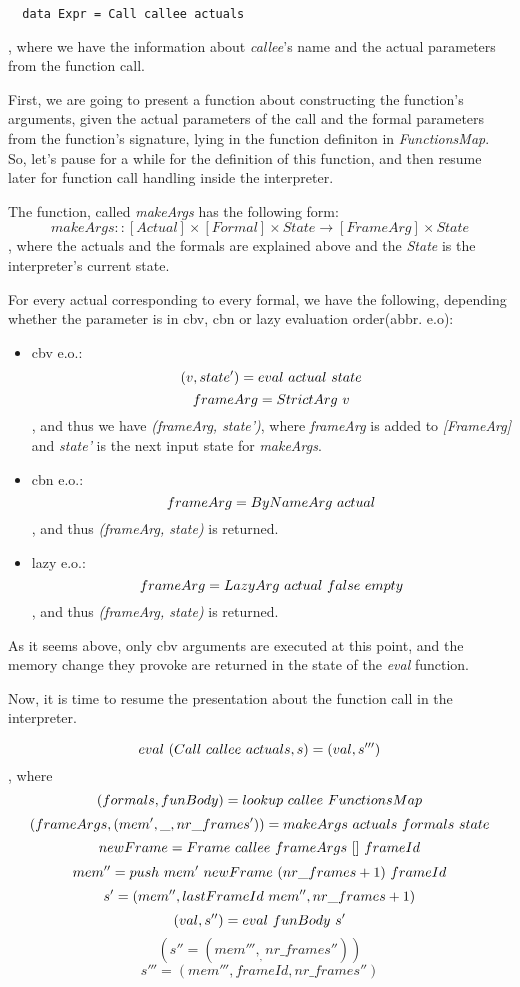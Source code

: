 \documentclass[diploma]{softlab-thesis}
\begin{document}
\begin{verbatim}
  data Expr = Call callee actuals 
\end{verbatim}

, where we have the information about \textit{callee}'s name and the actual parameters from the function call. 

First, we are going to present a function about constructing the function's arguments, given the actual parameters of the call 
and the formal parameters from the function's signature, lying in the function definiton in \textit{FunctionsMap}. So, let's 
pause for a while for the definition of this function, and then resume later for function call handling inside the 
interpreter.

The function, called \textit{makeArgs} has the following form:
\[makeArgs :: [Actual] \times [Formal] \times State \rightarrow [FrameArg] \times State \]
, where the actuals and the formals are explained above and the \textit{State} is the interpreter's current state.

For every actual corresponding to every formal, we have the following, depending whether the parameter is in 
cbv, cbn or lazy evaluation order(abbr. e.o):
\begin{itemize}
  \item cbv e.o.: 
  \[(v, state') = eval \hfill\ actual \hfill\ state \]
  \[frameArg = StrictArg \hfill\ v\]
  , and thus we have \textit{(frameArg, state')}, where \textit{frameArg} is added to \textit{[FrameArg]} and 
  \textit{state'} is the next input state for \textit{makeArgs}. 
  \item cbn e.o.:
  \[frameArg = ByNameArg \hfill\ actual \] 
  , and thus \textit{(frameArg, state)} is returned.
  \item lazy e.o.:
  \[frameArg = LazyArg \hfill\ actual \hfill\ false \hfill\ empty \]
  , and thus \textit{(frameArg, state)} is returned.  
\end{itemize}

As it seems above, only cbv arguments are executed at this point, and the memory change they provoke are returned 
in the state of the \textit{eval} function.

Now, it is time to resume the presentation about the function call in the interpreter. 

\[eval \hfill\ (Call \hfill\ callee \hfill\ actuals, s) = (val, s''')\], where 
\[(formals, funBody) = lookup \hfill\ callee \hfill\ FunctionsMap\]
\[(frameArgs, (mem', \_, nr\_frames')) = makeArgs \hfill\ actuals \hfill\ formals  \hfill\ state \]
\[newFrame = Frame \hfill\ callee \hfill\ frameArgs \hfill\ [] \hfill\ frameId \]
\[mem'' = push \hfill\ mem' \hfill\ newFrame \hfill\ (nr\_frames + 1) \hfill\ frameId\]
\[s' = (mem'', lastFrameId \hfill\ mem'', nr\_frames + 1) \]
\[(val, s'') = eval \hfill\ funBody \hfill\ s' \]
\[(s'' = (mem''', _, nr\_frames'')) \]
\[s''' = (mem''', frameId, nr\_frames'') \]
\end{document}
